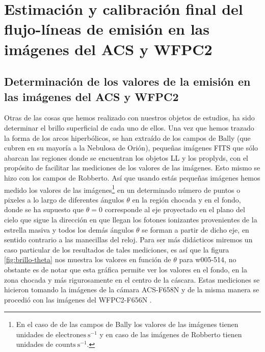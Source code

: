 \section{Estimación y calibración final del flujo-líneas de emisión en las imágenes del ACS y WFPC2}
\label{sec:clibration-final}

\subsection{Determinación de los valores  de la emisión en las imágenes del ACS y WFPC2 }
\label{sec:brillo-superficial}
Otras de las cosas que hemos realizado con nuestros objetos de estudios, ha  sido determinar el brillo superficial de cada uno de ellos. Una vez que hemos trazado la forma de los arcos hiperbólicos, se han extraído de los campos de Bally (que cubren en su mayoría a la Nebulosa de Orión), pequeñas imágenes FITS que sólo abarcan las regiones donde se encuentran los objetos LL y los proplyds, con el propósito de facilitar las mediciones de los valores de las imágenes. Esto mismo se hizo con los campos de Robberto. Así que usando estás pequeñas imágenes hemos medido los valores de las imágenes\footnote{En el caso de de las campos de Bally los valores de las imágenes tienen unidades de \(\mathrm{electrones~s^{-1}}\) y en caso de las imágenes de Robberto tienen unidades de \(\text{counts}~\text{s}^{-1}\).} en un determinado número de puntos o pixeles a lo largo de diferentes ángulos \(\theta\) en la región chocada y en el fondo, donde se ha supuesto que \(\theta = 0\) corresponde al eje proyectado en el plano del cielo que sigue la dirección en que llegan los fotones ionizantes provenientes de la estrella masiva y todos los demás ángulos \(\theta\) se forman a partir de dicho eje, en sentido contrario a las manecillas del reloj. Para ser más didácticos miremos un caso particular de los resultados de tales mediciones, es así que la figura \ref{fig:brillo-theta} nos muestra los valores en función de \(\theta\) para w005-514, no obstante es de notar que esta gráfica permite ver los valores en el fondo, en la zona chocada y más rigurosamente en el centro de la cáscara. Estas mediciones se hicieron tomando la imágenes de la cámara ACS-F658N y de la misma manera se procedió con las imágenes del WFPC2-F656N \citep{Robberto:2013a}. \\


